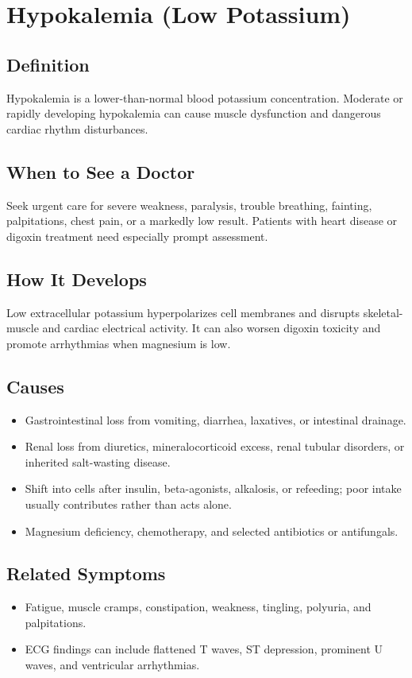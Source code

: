 \chapter{Hypokalemia (Low Potassium)}

\section*{Definition}
Hypokalemia is a lower-than-normal blood potassium concentration. Moderate or rapidly developing hypokalemia can cause muscle dysfunction and dangerous cardiac rhythm disturbances.

\section*{When to See a Doctor}
Seek urgent care for severe weakness, paralysis, trouble breathing, fainting, palpitations, chest pain, or a markedly low result. Patients with heart disease or digoxin treatment need especially prompt assessment.

\section*{How It Develops}
Low extracellular potassium hyperpolarizes cell membranes and disrupts skeletal-muscle and cardiac electrical activity. It can also worsen digoxin toxicity and promote arrhythmias when magnesium is low.

\section*{Causes}
\begin{itemize}
  \item Gastrointestinal loss from vomiting, diarrhea, laxatives, or intestinal drainage.
  \item Renal loss from diuretics, mineralocorticoid excess, renal tubular disorders, or inherited salt-wasting disease.
  \item Shift into cells after insulin, beta-agonists, alkalosis, or refeeding; poor intake usually contributes rather than acts alone.
  \item Magnesium deficiency, chemotherapy, and selected antibiotics or antifungals.
\end{itemize}

\section*{Related Symptoms}
\begin{itemize}
  \item Fatigue, muscle cramps, constipation, weakness, tingling, polyuria, and palpitations.
  \item ECG findings can include flattened T waves, ST depression, prominent U waves, and ventricular arrhythmias.
\end{itemize}

